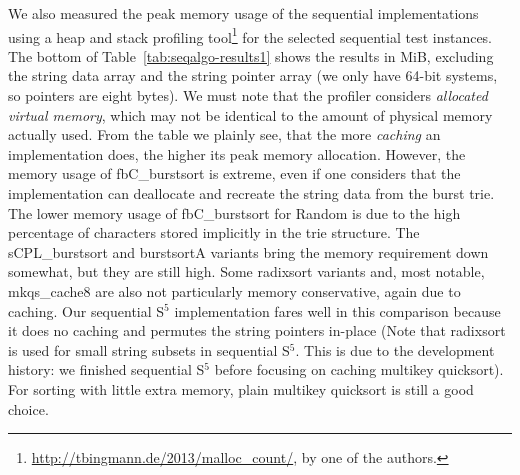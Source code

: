 \documentclass[a4paper]{myjournal}
\begin{document}
We also measured the peak memory usage of the sequential implementations using a
heap and stack profiling
tool\footnote{\url{http://tbingmann.de/2013/malloc_count/}, by one of the
  authors.} for the selected sequential test instances. The bottom of
Table~\ref{tab:seqalgo-results1} shows the results in MiB, excluding the string
data array and the string pointer array (we only have 64-bit systems, so
pointers are eight bytes). We must note that the profiler considers
\emph{allocated virtual memory}, which may not be identical to the amount of
physical memory actually used. From the table we plainly see, that the more
\emph{caching} an implementation does, the higher its peak memory
allocation. However, the memory usage of fbC\_burstsort is extreme, even if one
considers that the implementation can deallocate and recreate the string data
from the burst trie. The lower memory usage of fbC\_burstsort for Random is due
to the high percentage of characters stored implicitly in the trie structure.
The sCPL\_burstsort and burstsortA variants bring the memory requirement down
somewhat, but they are still high. Some radixsort variants and, most notable,
mkqs\_cache8 are also not particularly memory conservative, again due to
caching. Our sequential S$^5$ implementation fares well in this comparison
because it does no caching and permutes the string pointers in-place (Note that
radixsort is used for small string subsets in sequential S$^5$. This is due to
the development history: we finished sequential S$^5$ before focusing on caching
multikey quicksort). For sorting with little extra memory, plain multikey
quicksort is still a good choice.
\end{document}
